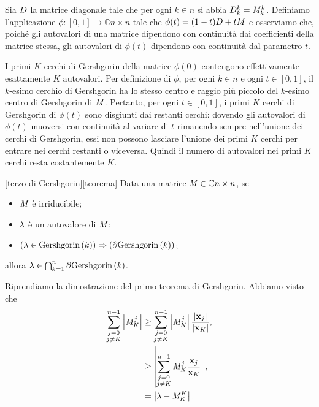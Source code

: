 \Proof Sia $D$ la matrice diagonale tale che per ogni
$k \in n$ si abbia
$D_k^k = \mathit{M}_k^k$.
Definiamo l'applicazione
$\phi: [0,1] \rightarrow \mathbb{C}{n \times n}$ tale che
$\phi(t) = (1 - t)D + t\mathit{M}$ e osserviamo che,
poich\'e gli autovalori di una matrice dipendono con continuit\`a dai
coefficienti della matrice stessa, gli autovalori di $\phi(t)$ dipendono con
continuit\`a dal parametro $t$.
\par I primi $K$ cerchi di Gershgorin della matrice $\phi(0)$ contengono
effettivamente esattamente $K$ autovalori.
Per definizione di $\phi$, per ogni $k \in n$ e ogni $t \in [0,1]$, il
$k$-esimo cerchio di Gershgorin ha lo stesso centro e raggio pi\`u piccolo
del $k$-esimo centro di Gershgorin di $\mathit{M}$.
Pertanto, per ogni $t \in [0,1]$, i primi $K$ cerchi di Gershgorin di
$\phi(t)$ sono disgiunti dai restanti cerchi: dovendo gli autovalori di
$\phi(t)$ muoversi con continuit\`a al variare di $t$ rimanendo sempre
nell'unione dei cerchi di Gershgorin, essi non possono lasciare l'unione
dei primi $K$ cerchi per entrare nei cerchi restanti o viceversa.
Quindi il numero di autovalori nei primi $K$ cerchi resta costantemente $K$.
\EndProof
\begin{Theorem}
	[terzo di Gershgorin][teorema]
  Data una matrice $\mathit{M} \in \mathbb{C}{n \times n}$, se
	\begin{itemize}
		\item $\mathit{M}$ \`e irriducibile;
		\item $\lambda$ \`e un autovalore di $\mathit{M}$;
		\item $\Implies{\Eigenvalue \in \GershgorinDisk{k}}{\Boundary\GershgorinDisk{k}}$;
	\end{itemize}
	allora $\Eigenvalue \in \bigcap_{k = 1}^n \Boundary{\GershgorinDisk{k}}$.
\end{Theorem}
\Proof Riprendiamo la dimostrazione del primo teorema di Gershgorin.
Abbiamo visto che
\begin{align*}
  \sum_{\substack{j = 0\\j \neq K}}^{n - 1} \AbsoluteValue{\Matrix_K^j}
  &\geq \sum_{\substack{j = 0\\j \neq K}}^{n - 1} \AbsoluteValue{\Matrix_K^j}
    \frac{\AbsoluteValue{\Eigenvector_j}}{\AbsoluteValue{\Eigenvector_K}},\\
  &\geq \AbsoluteValue{\sum_{\substack{j = 0\\j \neq K}}^{n - 1} \Matrix_K^j
    \frac{\Eigenvector_j}{\Eigenvector_K}},\\
  &= \AbsoluteValue{\Eigenvalue - \Matrix_K^K}.
\end{align*}
